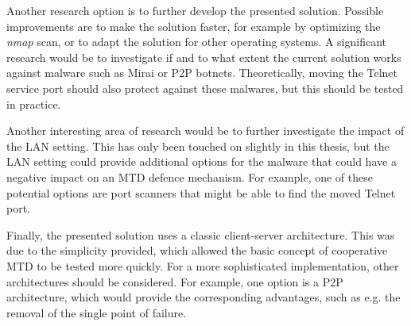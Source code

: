 Another research option is to further develop the presented solution. Possible improvements are to make the solution faster, for example by optimizing the \textit{nmap} scan, or to adapt the solution for other operating systems. A significant research would be to investigate if and to what extent the current solution works against malware such as Mirai or P2P botnets. Theoretically, moving the Telnet service port should also protect against these malwares, but this should be tested in practice.       

Another interesting area of research would be to further investigate the impact of the LAN setting. This has only been touched on slightly in this thesis, but the LAN setting could provide additional options for the malware that could have a negative impact on an MTD defence mechanism. For example, one of these potential options are port scanners that might be able to find the moved Telnet port.

Finally, the presented solution uses a classic client-server architecture. This was due to the simplicity provided, which allowed the basic concept of cooperative MTD to be tested more quickly. For a more sophisticated implementation, other architectures should be considered. For example, one option is 
a P2P architecture, which would provide the corresponding advantages, such as e.g. the removal of the single point of failure.



